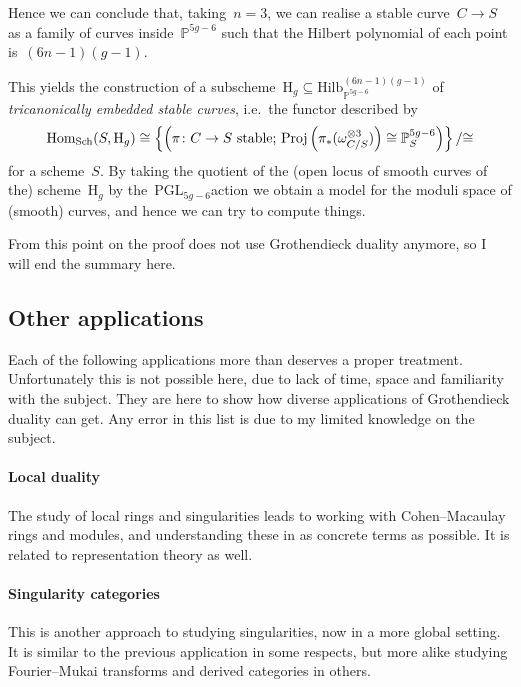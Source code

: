 \documentclass[10pt,a4paper]{article}
\begin{document}
Hence we can conclude that, taking~$n=3$, we can realise a stable curve~$C\to S$ as a family of curves inside~$\mathbb{P}^{5g-6}$ such that the Hilbert polynomial of each point is~$(6n-1)(g-1)$.

This yields the construction of a subscheme~$\mathrm{H}_g\subseteq\mathrm{Hilb}_{\mathbb{P}^{5g-6}}^{(6n-1)(g-1)}$ of \emph{tricanonically embedded stable curves}, i.e.\ the functor described by
\begin{equation}
  \operatorname{Hom}_{\mathrm{Sch}}(S,\mathrm{H}_g)\cong\left\{ \left( \text{$\pi\colon C\to S$ stable; $\operatorname{Proj}\left( \pi_*(\omega_{C/S}^{\otimes 3}) \right)\cong\mathbb{P}_S^{5g-6}$} \right) \right\}/{\cong}
\end{equation}
for a scheme~$S$. By taking the quotient of the (open locus of smooth curves of the) scheme~$\mathrm{H}_g$ by the~$\mathrm{PGL}_{5g-6}$\dash action we obtain a model for the moduli space of (smooth) curves, and hence we can try to compute things.

From this point on the proof does not use Grothendieck duality anymore, so I will end the summary here.


\subsection{Other applications}
Each of the following applications more than deserves a proper treatment. Unfortunately this is not possible here, due to lack of time, space and familiarity with the subject. They are here to show how diverse applications of Grothendieck duality can get. Any error in this list is due to my limited knowledge on the subject.

\paragraph{Local duality}
The study of local rings and singularities leads to working with Cohen--Macaulay rings and modules, and understanding these in as concrete terms as possible. It is related to representation theory as well.

\paragraph{Singularity categories}
This is another approach to studying singularities, now in a more global setting. It is similar to the previous application in some respects, but more alike studying Fourier--Mukai transforms and derived categories in others.
\end{document}

